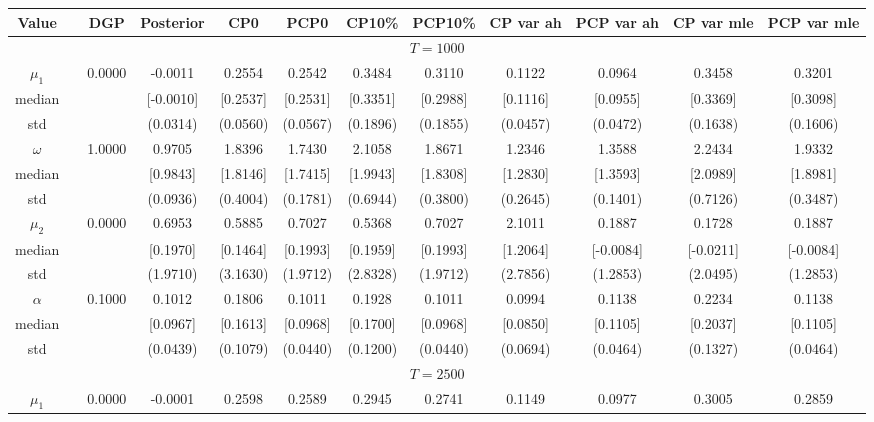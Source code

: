 { \renewcommand{\arraystretch}{1.2} 
\begin{sidewaystable} 
\center 
\begin{tabular}{cc cc| cccc| cccc} 
Value && DGP & Posterior & CP0  & PCP0 & CP10\%  & PCP10\% &CP var ah & PCP var ah & CP var mle & PCP var mle \\ \hline 
\hline 
\multicolumn{12}{c}{$T =1000$}  \\ 
\hline 
 \rowcolor{LightCyan} 
$\mu_{1}$&& 0.0000 & -0.0011 & 0.2554 & 0.2542 & 0.3484 & 0.3110 & 0.1122 & 0.0964 & 0.3458 & 0.3201  \\   
median &&  & [-0.0010] & [0.2537] & [0.2531] & [0.3351] & [0.2988] & [0.1116] & [0.0955] & [0.3369] & [0.3098]  \\ 
std &&   & (0.0314) & (0.0560) & (0.0567) & (0.1896) & (0.1855) &(0.0457) & (0.0472) & (0.1638) & (0.1606)  \\ 
 \rowcolor{LightCyan} 
$\omega$&& 1.0000 & 0.9705 & 1.8396 & 1.7430 & 2.1058 & 1.8671 & 1.2346 & 1.3588 & 2.2434 & 1.9332  \\   
median &&  & [0.9843] & [1.8146] & [1.7415] & [1.9943] & [1.8308] & [1.2830] & [1.3593] & [2.0989] & [1.8981]  \\ 
std &&   & (0.0936) & (0.4004) & (0.1781) & (0.6944) & (0.3800) &(0.2645) & (0.1401) & (0.7126) & (0.3487)  \\ 
 \rowcolor{LightCyan} 
$\mu_{2}$&& 0.0000 & 0.6953 & 0.5885 & 0.7027 & 0.5368 & 0.7027 & 2.1011 & 0.1887 & 0.1728 & 0.1887  \\   
median &&  & [0.1970] & [0.1464] & [0.1993] & [0.1959] & [0.1993] & [1.2064] & [-0.0084] & [-0.0211] & [-0.0084]  \\ 
std &&   & (1.9710) & (3.1630) & (1.9712) & (2.8328) & (1.9712) &(2.7856) & (1.2853) & (2.0495) & (1.2853)  \\ 
 \rowcolor{LightCyan} 
$\alpha$&& 0.1000 & 0.1012 & 0.1806 & 0.1011 & 0.1928 & 0.1011 & 0.0994 & 0.1138 & 0.2234 & 0.1138  \\   
median &&  & [0.0967] & [0.1613] & [0.0968] & [0.1700] & [0.0968] & [0.0850] & [0.1105] & [0.2037] & [0.1105]  \\ 
std &&   & (0.0439) & (0.1079) & (0.0440) & (0.1200) & (0.0440) &(0.0694) & (0.0464) & (0.1327) & (0.0464)  \\ 
\hline 
\multicolumn{12}{c}{$T =2500$}  \\ 
\hline 
 \rowcolor{LightCyan} 
$\mu_{1}$&& 0.0000 & -0.0001 & 0.2598 & 0.2589 & 0.2945 & 0.2741 & 0.1149 & 0.0977 & 0.3005 & 0.2859  \\   

\end{tabular}
\end{sidewaystable}}
